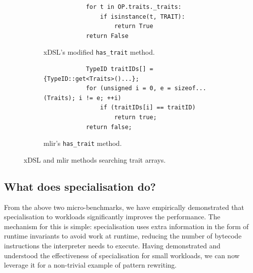 \begin{figure}[H]
    \centering
    \begin{subfigure}[b]{0.45\textwidth}
       \centering
        \begin{verbatim}
            for t in OP.traits._traits:
                if isinstance(t, TRAIT):
                    return True
            return False
        \end{verbatim}
        \footnotesize\vspace{2em}
        \captionsetup{name=Listing}
        \caption{xDSL's modified \texttt{has_trait} method.}
        \label{listing:ubenchmark-trait-checks-both-xdsl}
    \end{subfigure}
    \hfill
    \begin{subfigure}[b]{0.45\textwidth}
        \centering
        \begin{verbatim}
            TypeID traitIDs[] = {TypeID::get<Traits>()...};
            for (unsigned i = 0, e = sizeof...(Traits); i != e; ++i)
                if (traitIDs[i] == traitID)
                    return true;
            return false;
        \end{verbatim}
        \captionsetup{name=Listing}
        \caption{\ac{mlir}'s \texttt{has_trait} method.}
        \label{listing:ubenchmark-trait-checks-both-mlir}
    \end{subfigure}
    \vspace{1em}
    \captionsetup{name=Listing}
    \caption{xDSL and \ac{mlir} methods searching trait arrays.}
    \label{listing:ubenchmark-trait-checks-both}
\end{figure}




\subsection{What does specialisation do?}
\label{ssec:specialising-what-do}

From the above two micro-benchmarks, we have empirically demonstrated that specialisation to workloads significantly improves the performance.
The mechanism for this is simple: specialisation uses extra information in the form of runtime invariants to avoid work at runtime, reducing the number of bytecode instructions the interpreter needs to execute.
Having demonstrated and understood the effectiveness of specialisation for small workloads, we can now leverage it for a non-trivial example of pattern rewriting.



